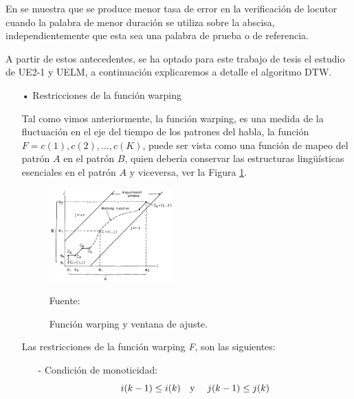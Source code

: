 \begin{enumerate}
\vskip 0.5cm
En \citep{furui} se muestra que se produce menor tasa de error en la verificación de locutor cuando la palabra de menor duración se utiliza sobre la abscisa, independientemente que esta sea una palabra de prueba o de referencia.

\vskip 0.5cm
A partir de estos antecedentes, se ha optado para este trabajo de tesis el estudio de UE2-1 y UELM, a continuación explicaremos a detalle el algoritmo DTW.

\begin{enumerate}
\item[•]Restricciones de la función warping
\par
Tal como vimos anteriormente, la función warping, es una medida de la fluctuación en el eje del tiempo de los patrones del habla, la función $F = c(1), c(2),..., c(K)$, puede ser vista como una función de mapeo del patrón $A$ en el patrón $B$, quien debería conservar las estructuras lingüísticas esenciales en el patrón $A$ y viceversa, ver la Figura \ref{fig:figura2.52}.
\begin{figure}[H]
\begin{center}
\includegraphics[width=0.45\textwidth]{Imagenes/Cap2/image053}
\end{center}
\begin{center}
\vskip -0.5cm
\caption{\small{Función warping y ventana de ajuste.}}
\label{fig:figura2.52}
{\small{Fuente: \cite{sakoe}}}
\end{center}
\end{figure}

Las restricciones de la función warping \textit{F}, son las siguientes:
\begin{enumerate}
\item[-]Condición de monoticidad:
\begin{equation}
\label{eq:ecuacion80}
i(k - 1) \leq i(k)
\text{\quad y \quad}
j(k - 1) \leq j(k)
\end{equation}


\end{enumerate}
\end{enumerate}
\end{enumerate}
